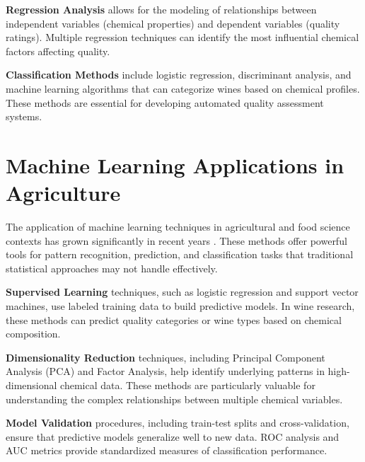 \textbf{Regression Analysis} allows for the modeling of relationships between independent variables (chemical properties) and dependent variables (quality ratings). Multiple regression techniques can identify the most influential chemical factors affecting quality.

\textbf{Classification Methods} include logistic regression, discriminant analysis, and machine learning algorithms that can categorize wines based on chemical profiles. These methods are essential for developing automated quality assessment systems.

\section{Machine Learning Applications in Agriculture}

The application of machine learning techniques in agricultural and food science contexts has grown significantly in recent years \cite{liakos2018}. These methods offer powerful tools for pattern recognition, prediction, and classification tasks that traditional statistical approaches may not handle effectively.

\textbf{Supervised Learning} techniques, such as logistic regression and support vector machines, use labeled training data to build predictive models. In wine research, these methods can predict quality categories or wine types based on chemical composition.

\textbf{Dimensionality Reduction} techniques, including Principal Component Analysis (PCA) and Factor Analysis, help identify underlying patterns in high-dimensional chemical data. These methods are particularly valuable for understanding the complex relationships between multiple chemical variables.

\textbf{Model Validation} procedures, including train-test splits and cross-validation, ensure that predictive models generalize well to new data. ROC analysis and AUC metrics provide standardized measures of classification performance.